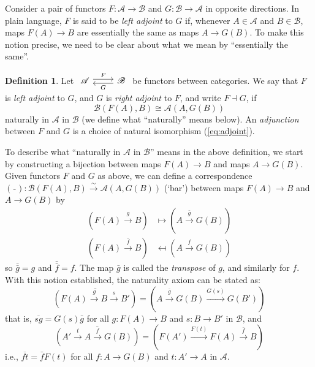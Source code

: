 \documentclass[10pt,oneside]{book}
\def\~#1{\mathscr{#1}}
\def\To#1{\xrightarrow{#1}}
\newcommand{\isom}{\xrightarrow{\sim}}
\theoremstyle{plain}
\theoremstyle{definition}
\newtheorem{defn}[thm]{Definition}
\theoremstyle{remark}
\numberwithin{equation}{section}
\numberwithin{figure}{section}
\begin{document}
Consider a pair of functors $F: \~A \to \~B$ and $G: \~B \to \~A$ in opposite directions. In plain language, $F$ is said to be \emph{left adjoint} to $G$ if, whenever $A \in \~A$ and $B \in \~B$, maps $F(A) \to B$ are essentially the same as maps $A \to G(B)$. To make this notion precise, we need to be clear about what we mean by ``essentially the same''.
\begin{defn}
\label{defn:adjunction}
Let $\begin{tikzcd}
    {\~A} & {\~B}
    \arrow["F", shift left, from=1-1, to=1-2]
    \arrow["G", shift left, from=1-2, to=1-1]
\end{tikzcd}$ be functors between categories. We say that $F$ is \emph{left adjoint} to $G$, and $G$ is \emph{right adjoint} to $F$, and write $F \dashv G$, if
\begin{equation}
\label{eq:adjoint}
\~B(F(A), B) \cong \~A(A, G(B))
\end{equation}
naturally in $\~A$ in $\~B$ (we define what ``naturally'' means below). An \emph{adjunction} between $F$ and $G$ is a choice of natural isomorphism (\ref{eq:adjoint}). 
\end{defn}
To describe what ``naturally in $\~A$ in $\~B$'' means in the above definition, we start by constructing a bijection between maps $F(A) \to B$ and maps $A \to G(B)$.   Given functors $F$ and $G$ as above, we can define a correspondence $(\bar{\,\,\,}): \~B(F(A), B) \isom \~A(A, G(B))$ (`bar') between maps $F(A) \to B$ and $A \to G(B)$ by
\begin{align*}
\left(F(A) \To{g} B \right) &\mapsto \left(A \To{\bar{g}} G(B) \right) \\
\left(F(A) \To{\bar{f}} B \right) &\mapsfrom \left(A \To{f} G(B) \right) 
\end{align*}
so $\bar{\bar{g}} = g$ and $\bar{\bar{f}} = f$. The map $\bar{g}$ is called the \emph{transpose} of $g$, and similarly for $f$. With this notion established, the naturality axiom can be stated as:
\begin{equation}
\label{eq:bar_axiom1}
\overline{\left(F(A) \To{g} B \To{s} B' \right)} = \left(A \To{\bar{g}} G(B) \To{G(s)} G(B') \right)
\end{equation}
that is, $\overline{sg} = G(s)\bar{g} $ for all $g: F(A) \to B$ and $s: B \to B'$ in $\~B$, and
\begin{equation}
\label{eq:bar_axiom2}
\overline{\left(A' \To{t} A \To{f} G(B) \right)} = \left(F(A') \To{F(t)} F(A) \To{\bar{f}} B \right)
\end{equation}
i.e., $\overline{ft} =  \bar{f}F(t) $ for all $f:A \to G(B)$ and $t: A' \to A$ in $\~A$.
\end{document}
